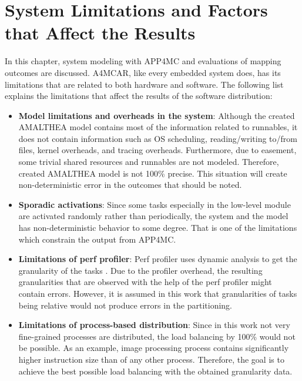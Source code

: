 \section{System Limitations and Factors that Affect the Results} %
In this chapter, system modeling with APP4MC and evaluations of mapping outcomes are discussed. A4MCAR, like every embedded system does, has its limitations that are related to both hardware and software. The following list explains the limitations that affect the results of the software distribution:
\begin{itemize}
	\item \textbf{Model limitations and overheads in the system}: Although the created AMALTHEA model contains most of the information related to runnables, it does not contain information such as OS scheduling, reading/writing to/from files, kernel overheads, and tracing overheads. Furthermore, due to easement, some trivial shared resources and runnables are not modeled. Therefore, created AMALTHEA model is not 100\% precise. This situation will create non-deterministic error in the outcomes that should be noted. 
	\item \textbf{Sporadic activations}: Since some tasks especially in the low-level module are activated randomly rather than periodically, the system and the model has non-deterministic behavior to some degree. That is one of the limitations which constrain the output from APP4MC. %
	\item \textbf{Limitations of perf profiler}: Perf profiler uses dynamic analysis to get the granularity of the tasks \cite{perf2}. Due to the profiler overhead, the resulting granularities that are observed with the help of the perf profiler might contain errors. However, it is assumed in this work that granularities of tasks being relative would not produce errors in the partitioning.
	\item \textbf{Limitations of process-based distribution}: Since in this work not very fine-grained processes are distributed, the load balancing by 100\% would not be possible. As an example, image processing process contains significantly higher instruction size than of any other process. Therefore, the goal is to achieve the best possible load balancing with the obtained granularity data. %

\end{itemize}
